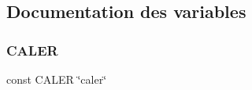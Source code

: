 \subsection{Documentation des variables}
\hypertarget{php_2conjugador__gr3_8inc_afb7f357610ed4add7b75ee405fc8c69c}{}\label{php_2conjugador__gr3_8inc_afb7f357610ed4add7b75ee405fc8c69c} 
\subsubsection{\texorpdfstring{C\+A\+L\+ER}{CALER}}
{\footnotesize\ttfamily const C\+A\+L\+ER \char`\"{}caler\char`\"{}}

